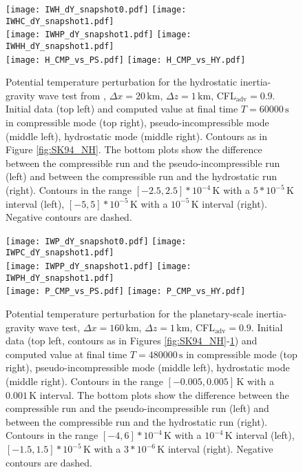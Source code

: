\documentclass[12pt,a4paper]{article}
\theoremstyle{definition}
\begin{document}
\begin{figure}
\centering
 \texttt{[image: IWH\_dY\_snapshot0.pdf]}
 \texttt{[image: IWHC\_dY\_snapshot1.pdf]}\\
 \texttt{[image: IWHP\_dY\_snapshot1.pdf]}
 \texttt{[image: IWHH\_dY\_snapshot1.pdf]}\\
  \texttt{[image: H\_CMP\_vs\_PS.pdf]}
 \texttt{[image: H\_CMP\_vs\_HY.pdf]}
 \caption{Potential temperature perturbation for the hydrostatic inertia-gravity wave test from \cite{SkamarockKlemp1994},  $\Delta x=20\,\textrm{km},\,\Delta z=1\,\textrm{km}$, CFL$_\textrm{adv}=0.9$. Initial data (top left) and computed value at final time $T=60000\,\textrm{s}$ in compressible mode (top right), pseudo-incompressible mode (middle left), hydrostatic mode (middle right). Contours as in Figure \ref{fig:SK94_NH}. The bottom plots show the difference between the compressible run and the pseudo-incompressible run (left) and between the compressible run and the hydrostatic run (right). Contours in the range $[-2.5, 2.5]*10^{-4}\,\textrm{K}$ with a $5*10^{-5}\,\textrm{K}$ interval (left), $[-5, 5]*10^{-5}\,\textrm{K}$  with a $10^{-5}\,\textrm{K}$ interval (right). Negative contours are dashed.}
 \label{fig:SK94_H} 
 \end{figure}

 \begin{figure}
\centering
 \texttt{[image: IWP\_dY\_snapshot0.pdf]}
 \texttt{[image: IWPC\_dY\_snapshot1.pdf]}\\
 \texttt{[image: IWPP\_dY\_snapshot1.pdf]}
 \texttt{[image: IWPH\_dY\_snapshot1.pdf]}\\
  \texttt{[image: P\_CMP\_vs\_PS.pdf]}
 \texttt{[image: P\_CMP\_vs\_HY.pdf]}
 \caption{Potential temperature perturbation for the planetary-scale inertia-gravity wave test,  $\Delta x=160\,\textrm{km},\,\Delta z=1\,\textrm{km}$, CFL$_\textrm{adv}=0.9$. Initial data (top left, contours as in Figures \ref{fig:SK94_NH}-\ref{fig:SK94_H}) and computed value at final time $T=480000\,\textrm{s}$ in compressible mode (top right), pseudo-incompressible mode (middle left), hydrostatic mode (middle right). Contours in the range $[-0.005, 0.005]\,\textrm{K}$ with a $0.001\,\textrm{K}$ interval. The bottom plots show the difference between the compressible run and the pseudo-incompressible run (left) and between the compressible run and the hydrostatic run (right). Contours in the range $[-4, 6]*10^{-4}\,\textrm{K}$ with a $10^{-4}\,\textrm{K}$ interval (left), $[-1.5, 1.5]*10^{-5}\,\textrm{K}$ with a $3*10^{-6}\,\textrm{K}$ interval (right). Negative contours are dashed.}
 \label{fig:SK94_P} 
 \end{figure}
\end{document}
